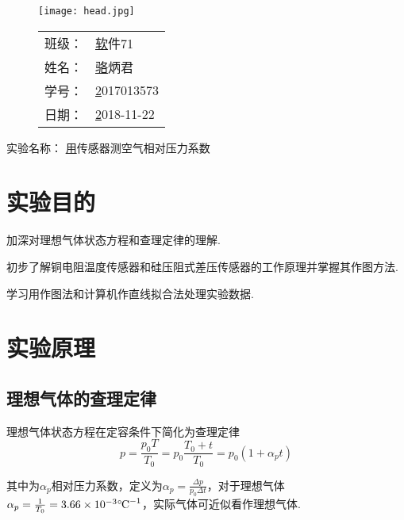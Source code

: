 \documentclass{thureport}
\newcommand{\major}{软件71}
\newcommand{\name}{骆炳君}
\newcommand{\stuid}{2017013573}
\newcommand{\newdate}{2018-11-22}
\newcommand{\newtitle}{用传感器测空气相对压力系数}
\def\celsius{{\ensuremath{^\circ\hspace{-0.09em}\mathrm{C}}}}
\begin{document}
\thispagestyle{empty}
\begin{figure}[h]
	\begin{minipage}{0.65\linewidth}
		\centerline{\texttt{[image: head.jpg]}}
	\end{minipage}
	\hfill
	\begin{minipage}{.3\linewidth}
		\raggedleft
		\begin{tabular*}{.8\linewidth}{ll}
			班级： & \underline\major   \\
			姓名： & \underline\name    \\
			学号： & \underline\stuid   \\
			日期： & \underline\newdate
		\end{tabular*}
	\end{minipage}
\end{figure}

\begin{table}[!htbp]
	\centering\large
	实验名称： \underline\newtitle
\end{table}

\tableofcontents
\newpage

\section{实验目的}
\begin{clause}
	\item 加深对理想气体状态方程和查理定律的理解.
	\item 初步了解铜电阻温度传感器和硅压阻式差压传感器的工作原理并掌握其作图方法.
	\item 学习用作图法和计算机作直线拟合法处理实验数据.
\end{clause}

\section{实验原理}
\subsection{理想气体的查理定律}
理想气体状态方程在定容条件下简化为查理定律
$$p=\frac{p_0T}{T_0}=p_0\frac{T_0+t}{T_0}=p_0(1+\alpha_pt)$$

其中为$\alpha_p$相对压力系数，定义为$\alpha_p=\frac{\Delta p}{p_0\Delta t}$，对于理想气体$\alpha_p=\frac{1}{T_0}=3.66\times10^{-3}\celsius^{-1}$，实际气体可近似看作理想气体.
\end{document}
